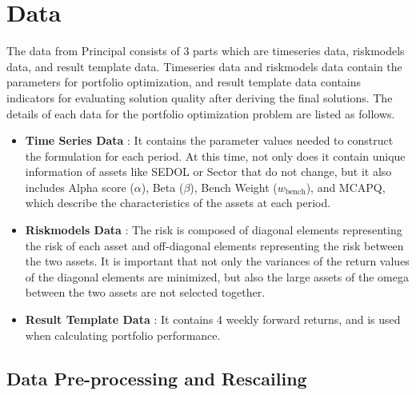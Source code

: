 \documentclass[11pt]{article}
\begin{document}
	
	
	
	
	\section*{Data}
	The data from Principal consists of 3 parts which are timeseries data, riskmodels data, and result template data. Timeseries data and riskmodels data contain the parameters for portfolio optimization, and result template data contains indicators for evaluating solution quality after deriving the final solutions. The details of each data for the portfolio optimization problem are listed as follows. 
	
	\begin{itemize}
		\item \textbf{Time Series Data} : It contains the parameter values needed to construct the formulation for each period. At this time, not only does it contain unique information of assets like SEDOL or Sector that do not change, but it also includes Alpha score ($\alpha$), Beta ($\beta$), Bench Weight ($w_{\text{bench}}$), and MCAPQ, which describe the characteristics of the assets at each period.
		\item \textbf{Riskmodels Data} : The risk is composed of diagonal elements representing the risk of each asset and off-diagonal elements representing the risk between the two assets. It is important that not only the variances of the return values of the diagonal elements are minimized, but also the large assets of the omega between the two assets are not selected together.
		\item \textbf{Result Template Data} : It contains 4 weekly forward returns, and is used when calculating portfolio performance. 
	\end{itemize}
	
	
	\subsection{Data Pre-processing and Rescailing}
	
\end{document}
